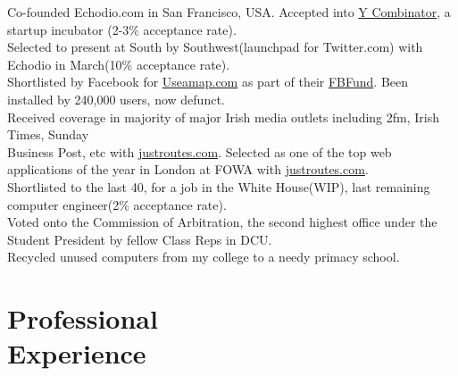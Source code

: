 \documentclass[margin,line]{resume}
\begin{document}
\begin{resume}
    Co-founded Echodio.com in San Francisco, USA. Accepted into \href{http://ycombinator.com/}{Y Combinator}, a startup incubator (2-3\% acceptance rate).\vspace{1mm}\\%
    Selected to present at South by Southwest(launchpad for Twitter.com) with Echodio in March(10\% acceptance rate).\vspace{1mm}\\%
    Shortlisted by Facebook for \href{http://useamap.}{Useamap.com} as part of their \href{http://fbfund.com/about/}{FBFund}. Been installed by 240,000 users, now defunct.\vspace{1mm}\\%
    Received coverage in majority of major Irish media outlets including 2fm, Irish Times, Sunday \\ Business Post, etc with \href{http://justroutes.com}{justroutes.com}. Selected as one of the top web applications of the year in London at FOWA with \href{http://justroutes.com}{justroutes.com}.\vspace{1mm}\\%
    Shortlisted to the last 40, for a job in the White House(WIP), last remaining \\ computer engineer(2\% acceptance rate).\vspace{1mm}\\%
    Voted onto the Commission of Arbitration, the second highest office under the Student President by fellow Class Reps in DCU.\vspace{1mm}\\%
    Recycled unused computers from my college to a needy primacy school.\vspace{1mm}\\%


    \section{\mysidestyle Professional\\Experience}


\end{resume}
\end{document}
